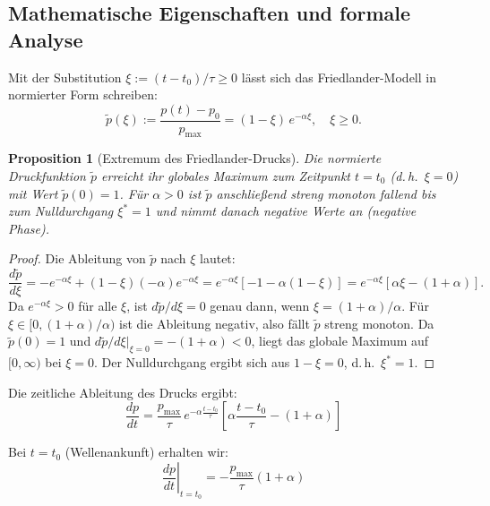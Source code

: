 ﻿\documentclass[12pt,a4paper]{article}
\newtheorem{proposition}[theorem]{Proposition}
\theoremstyle{definition}
\theoremstyle{remark}
\begin{document}
\subsection{Mathematische Eigenschaften und formale Analyse}

Mit der Substitution $\xi := (t - t_0)/\tau \geq 0$ lässt sich das Friedlander-Modell in normierter Form schreiben:
\begin{equation}
\tilde{p}(\xi) := \frac{p(t) - p_0}{p_{\text{max}}} = (1 - \xi)\,e^{-\alpha\xi}, \quad \xi \geq 0.
\label{eq:friedlander_norm}
\end{equation}

\begin{proposition}[Extremum des Friedlander-Drucks]
\label{prop:friedlander_max}
Die normierte Druckfunktion $\tilde{p}$ erreicht ihr globales Maximum zum Zeitpunkt $t = t_0$ (d.\,h.~$\xi = 0$) mit Wert $\tilde{p}(0) = 1$. Für $\alpha > 0$ ist $\tilde{p}$ anschließend streng monoton fallend bis zum Nulldurchgang $\xi^* = 1$ und nimmt danach negative Werte an (negative Phase).
\end{proposition}
\begin{proof}
Die Ableitung von $\tilde{p}$ nach $\xi$ lautet:
\[
\frac{d\tilde{p}}{d\xi} = -e^{-\alpha\xi} + (1-\xi)(-\alpha)e^{-\alpha\xi} = e^{-\alpha\xi}[-1 - \alpha(1-\xi)] = e^{-\alpha\xi}[\alpha\xi - (1+\alpha)].
\]
Da $e^{-\alpha\xi} > 0$ für alle $\xi$, ist $d\tilde{p}/d\xi = 0$ genau dann, wenn $\xi = (1+\alpha)/\alpha$. Für $\xi \in [0,(1+\alpha)/\alpha)$ ist die Ableitung negativ, also fällt $\tilde{p}$ streng monoton. Da $\tilde{p}(0)=1$ und $d\tilde{p}/d\xi|_{\xi=0} = -(1+\alpha) < 0$, liegt das globale Maximum auf $[0,\infty)$ bei $\xi=0$. Der Nulldurchgang ergibt sich aus $1-\xi=0$, d.\,h.~$\xi^*=1$. 
\end{proof}

Die zeitliche Ableitung des Drucks ergibt:
\begin{equation}
\frac{dp}{dt} = \frac{p_{\text{max}}}{\tau}\,e^{-\alpha \frac{t-t_0}{\tau}} \left[ \alpha\frac{t-t_0}{\tau} - (1+\alpha) \right]
\end{equation}

Bei $t = t_0$ (Wellenankunft) erhalten wir:
\begin{equation}
\left.\frac{dp}{dt}\right|_{t=t_0} = -\frac{p_{\text{max}}}{\tau}(1+\alpha)
\end{equation}
\end{document}
